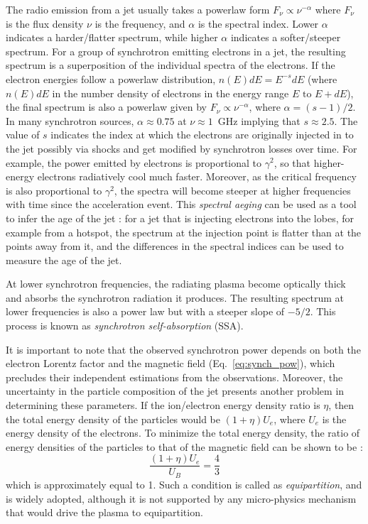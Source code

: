 The radio emission from a jet usually takes a powerlaw form $F_\nu\propto \nu^{-\alpha}$ where $F_\nu$ is the flux density $\nu$ is the frequency, and $\alpha$ is the spectral index. Lower $\alpha$ indicates a harder/flatter spectrum, while higher $\alpha$ indicates a softer/steeper spectrum. For a group of synchrotron emitting electrons in a jet, the resulting spectrum is a superposition of the individual spectra of the electrons. If the electron energies follow a powerlaw distribution, $n(E)dE=E^{-s}dE$ (where $n(E)dE$ in the number density of electrons in the energy range $E \text{~to~} E+dE$), the final spectrum is also a powerlaw given by $F_\nu\propto \nu^{-\alpha}$, where $\alpha=(s-1)/2$. In many synchrotron sources, $\alpha\approx0.75$ at $\nu\approx1$~GHz implying that $s\approx2.5$. The value of $s$ indicates the index at which the electrons are originally injected in to the jet possibly via shocks and get modified by synchrotron losses over time. For example, the power emitted by electrons is proportional to $\gamma^2$, so that higher-energy electrons radiatively cool much faster. Moreover, as the critical frequency is also proportional to $\gamma^2$, the spectra will become steeper at higher frequencies with time since the acceleration event. This \textit{spectral aeging} can be used as a tool to infer the age of the jet \citep[e.g.,][]{Harwood_2015}: for a jet that is injecting electrons into the lobes, for example from a hotspot, the spectrum at the injection point is flatter than at the points away from it, and the differences in the spectral indices can be used to measure the age of the jet. 


At lower synchrotron frequencies, the radiating plasma  become optically thick and absorbs the synchrotron radiation it produces. The resulting spectrum at lower frequencies is also a power law but with a steeper slope of $-5/2$. This process is known as \textit{synchrotron self-absorption} (SSA).

It is important to note that the observed synchrotron power depends on both the electron Lorentz factor and the magnetic field (Eq.~\ref{eq:synch_pow}), which precludes their independent estimations from the observations. Moreover, the uncertainty in the particle composition of the jet presents another problem in determining these parameters. If the ion/electron energy density ratio is $\eta$, then the total energy density of the particles would be $(1+\eta)U_e$, where $U_e$ is the energy density of the electrons. To minimize the total energy density, the ratio of energy densities of the particles to that of the magnetic field can be shown to be \citep{longair_2011}:
\begin{equation}
    \frac{(1+\eta)U_e}{U_B}=\frac{4}{3}
\end{equation}
which is approximately equal to 1. Such a condition is called as \textit{equipartition}, and is widely adopted, although it is not supported by any micro-physics mechanism that would drive the plasma to equipartition.


